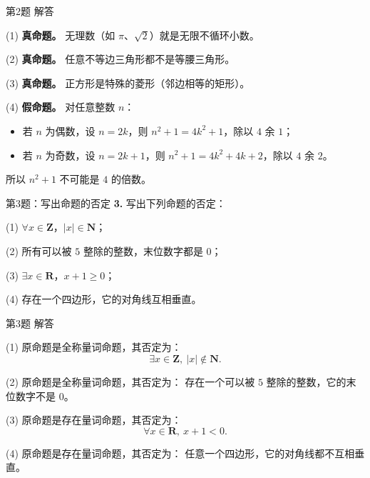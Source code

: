 \documentclass[10pt,aspectratio=169,serif]{beamer}
\begin{document}
\begin{frame}[t]{第2题 解答}
\begin{tcolorbox}[colback=orange!10,colframe=orange,title=\textbf{解}]
(1) \textbf{真命题。} 无理数（如 $\pi$、$\sqrt{2}$）就是无限不循环小数。

\vspace{0.5em}
(2) \textbf{真命题。} 任意不等边三角形都不是等腰三角形。

\vspace{0.5em}
(3) \textbf{真命题。} 正方形是特殊的菱形（邻边相等的矩形）。

\vspace{0.5em}
(4) \textbf{假命题。} 对任意整数 $n$：
\begin{itemize}
  \item 若 $n$ 为偶数，设 $n = 2k$，则 $n^2 + 1 = 4k^2 + 1$，除以 $4$ 余 $1$；
  \item 若 $n$ 为奇数，设 $n = 2k+1$，则 $n^2 + 1 = 4k^2 + 4k + 2$，除以 $4$ 余 $2$。
\end{itemize}
所以 $n^2 + 1$ 不可能是 $4$ 的倍数。
\end{tcolorbox}
\end{frame}

\begin{frame}[t]{第3题：写出命题的否定}
\textbf{3.} 写出下列命题的否定：

\vspace{0.5em}
(1) $\forall x \in \mathbf{Z}$，$|x| \in \mathbf{N}$；

\vspace{0.3em}
(2) 所有可以被 $5$ 整除的整数，末位数字都是 $0$；

\vspace{0.3em}
(3) $\exists x \in \mathbf{R}$，$x + 1 \ge 0$；

\vspace{0.3em}
(4) 存在一个四边形，它的对角线互相垂直。
\end{frame}

\begin{frame}[t]{第3题 解答}
\begin{tcolorbox}[colback=orange!10,colframe=orange,title=\textbf{解}]
(1) 原命题是全称量词命题，其否定为：
\[
\exists x \in \mathbf{Z},\ |x| \notin \mathbf{N}.
\]

\vspace{0.5em}
(2) 原命题是全称量词命题，其否定为：
存在一个可以被 $5$ 整除的整数，它的末位数字不是 $0$。

\vspace{0.5em}
(3) 原命题是存在量词命题，其否定为：
\[
\forall x \in \mathbf{R},\ x + 1 < 0.
\]

\vspace{0.5em}
(4) 原命题是存在量词命题，其否定为：
任意一个四边形，它的对角线都不互相垂直。
\end{tcolorbox}
\end{frame}
\end{document}
